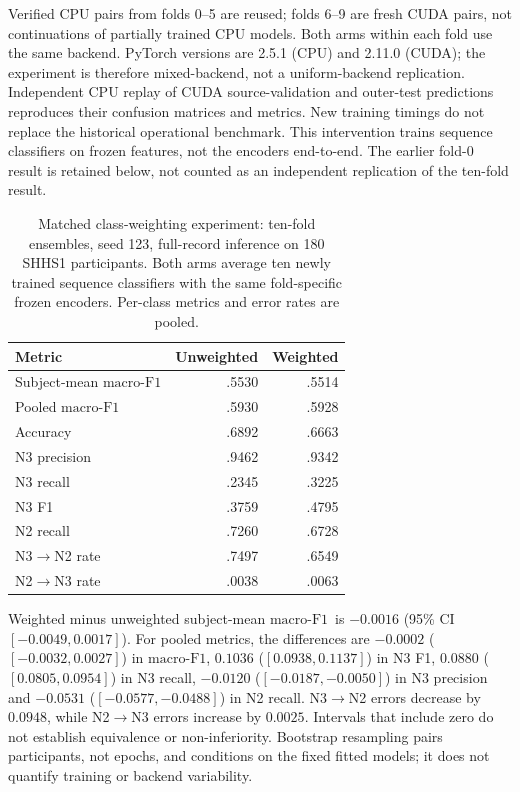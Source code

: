 \documentclass[10pt,a4paper]{article}
\newcommand{\mf}{\ensuremath{\mathrm{macro\text{-}F1}}}
\newcommand{\ci}{95\% CI}
\begin{document}
Verified CPU pairs from folds 0--5 are reused; folds 6--9 are fresh CUDA pairs, not continuations
of partially trained CPU models. Both arms within each fold use the same backend. PyTorch
versions are 2.5.1 (CPU) and 2.11.0 (CUDA); the experiment is therefore mixed-backend, not a
uniform-backend replication. Independent CPU replay of CUDA source-validation and outer-test
predictions reproduces their confusion matrices and metrics. New training timings do not
replace the historical operational benchmark. This intervention trains sequence classifiers
on frozen features, not the encoders end-to-end. The earlier fold-0 result is retained below,
not counted as an independent replication of the ten-fold result.

\begin{table}[H]
\centering\small
\caption{Matched class-weighting experiment: ten-fold ensembles, seed 123, full-record
inference on 180 SHHS1 participants. Both arms average ten newly trained sequence classifiers
with the same fold-specific frozen encoders. Per-class metrics and error rates are pooled.}
\label{tab:sup_weighted_intervention}
\begin{tabular}{lrr}
\toprule
Metric & Unweighted & Weighted \\
\midrule
Subject-mean \mf & .5530 & .5514 \\
Pooled \mf & .5930 & .5928 \\
Accuracy & .6892 & .6663 \\
N3 precision & .9462 & .9342 \\
N3 recall & .2345 & .3225 \\
N3 F1 & .3759 & .4795 \\
N2 recall & .7260 & .6728 \\
N3$\rightarrow$N2 rate & .7497 & .6549 \\
N2$\rightarrow$N3 rate & .0038 & .0063 \\
\bottomrule
\end{tabular}
\end{table}

Weighted minus unweighted subject-mean \mf\ is $-0.0016$ (\ci\ $[-0.0049,0.0017]$).
For pooled metrics, the differences are $-0.0002$ ($[-0.0032,0.0027]$) in \mf,
$0.1036$ ($[0.0938,0.1137]$) in N3 F1, $0.0880$ ($[0.0805,0.0954]$) in N3 recall,
$-0.0120$ ($[-0.0187,-0.0050]$) in N3 precision and $-0.0531$ ($[-0.0577,-0.0488]$)
in N2 recall. N3$\rightarrow$N2 errors decrease by $0.0948$, while N2$\rightarrow$N3
errors increase by $0.0025$. Intervals that include zero do not establish equivalence or
non-inferiority. Bootstrap resampling pairs participants, not epochs, and conditions on the
fixed fitted models; it does not quantify training or backend variability.
\end{document}

